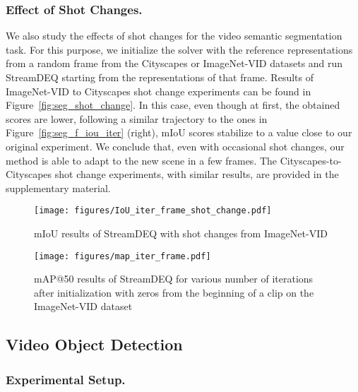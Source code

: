 \documentclass[runningheads]{llncs}
\begin{document}
\subsubsection{Effect of Shot Changes.}


We also study the effects of shot changes for the video semantic segmentation task. For this purpose, we initialize the solver with the reference representations from a random frame from the Cityscapes or ImageNet-VID datasets and run StreamDEQ starting from the representations of that frame. Results of ImageNet-VID to Cityscapes shot change experiments can be found in Figure~\ref{fig:seg_shot_change}. In this case, even though at first, the obtained scores are lower, following a similar trajectory to the ones in Figure~\ref{fig:seg_f_iou_iter} (right), mIoU scores stabilize to a value close to our original experiment. We conclude that, even with occasional shot changes, our method is able to adapt to the new scene in a few frames. The Cityscapes-to-Cityscapes shot change experiments, with similar results, are provided in the supplementary material.


\begin{figure*}[t]
  \begin{minipage}[t]{0.47\linewidth}
    \texttt{[image: figures/IoU\_iter\_frame\_shot\_change.pdf]}
    \caption{mIoU results of StreamDEQ with shot changes from ImageNet-VID}
    \label{fig:seg_shot_change}
  \end{minipage}\hfill \begin{minipage}[t]{0.47\linewidth}
    \texttt{[image: figures/map\_iter\_frame.pdf]}
    \caption{mAP@50 results of StreamDEQ for various number of iterations after initialization with zeros from the beginning of a clip on the ImageNet-VID dataset}
    \label{fig:map_iter_frame}
  \end{minipage}
\end{figure*}


\subsection{Video Object Detection}


\subsubsection{Experimental Setup.}
\end{document}

